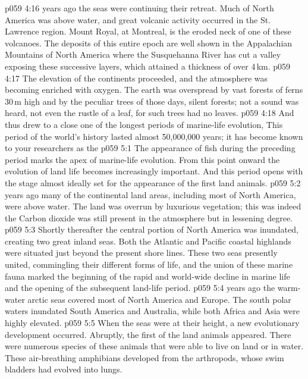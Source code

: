 \vs p059 4:16 \pc {} years ago the seas were continuing their retreat. Much of North America was above water, and great volcanic activity occurred in the St. Lawrence region. Mount Royal, at Montreal, is the eroded neck of one of these volcanoes. The deposits of this entire epoch are well shown in the Appalachian Mountains of North America where the Susquehanna River has cut a valley exposing these successive layers, which attained a thickness of over 4\,km.
\vs p059 4:17 \pc The elevation of the continents proceeded, and the atmosphere was becoming enriched with oxygen. The earth was overspread by vast forests of ferns 30\,m high and by the peculiar trees of those days, silent forests; not a sound was heard, not even the rustle of a leaf, for such trees had no leaves.
\vs p059 4:18 \pc And thus drew to a close one of the longest periods of marine\hyp{}life evolution,  This period of the world’s history lasted almost 50,000,000 years; it has become known to your researchers as the 
\vs p059 5:1 The appearance of fish during the preceding period marks the apex of marine\hyp{}life evolution. From this point onward the evolution of land life becomes increasingly important. And this period opens with the stage almost ideally set for the appearance of the first land animals.
\vs p059 5:2 \pc {} years ago many of the continental land areas, including most of North America, were above water. The land was overrun by luxurious vegetation; this was indeed the  Carbon dioxide was still present in the atmosphere but in lessening degree.
\vs p059 5:3 Shortly thereafter the central portion of North America was inundated, creating two great inland seas. Both the Atlantic and Pacific coastal highlands were situated just beyond the present shore lines. These two seas presently united, commingling their different forms of life, and the union of these marine fauna marked the beginning of the rapid and world\hyp{}wide decline in marine life and the opening of the subsequent land\hyp{}life period.
\vs p059 5:4 \pc {} years ago the warm\hyp{}water arctic seas covered most of North America and Europe. The south polar waters inundated South America and Australia, while both Africa and Asia were highly elevated.
\vs p059 5:5 When the seas were at their height, a new evolutionary development  occurred. Abruptly, the first of the land animals appeared. There were numerous species of these animals that were able to live on land or in water. These air\hyp{}breathing amphibians developed from the arthropods, whose swim bladders had evolved into lungs.
